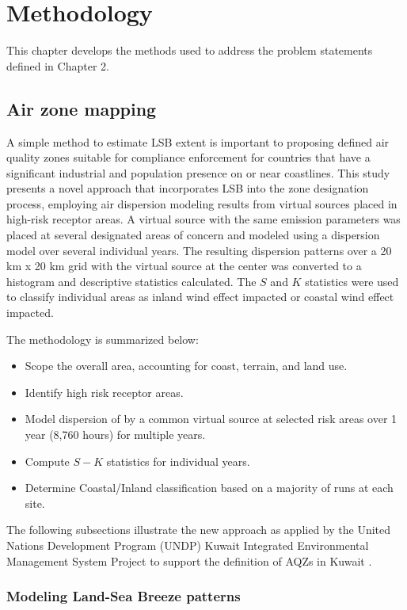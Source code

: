 \chapter{Methodology}
This chapter develops the methods used to address the problem statements defined in Chapter 2.

\section{Air zone mapping}

A simple method to estimate LSB extent is important to proposing defined air quality zones suitable for compliance enforcement for countries that have a significant industrial and population presence on or near coastlines.  This study presents a novel approach that incorporates LSB into the zone designation process, employing air dispersion modeling results from virtual sources placed in high-risk receptor areas.  A virtual source with the same emission parameters was placed at several designated areas of concern and modeled using a dispersion model over several individual years.  The resulting dispersion patterns over a 20 km x 20 km grid with the virtual source at the center was converted to a histogram and descriptive statistics calculated.  The $S$ and $K$ statistics were used to classify individual areas as inland wind effect impacted or coastal wind effect impacted.

The methodology is summarized below:
\begin{itemize}
\item Scope the overall area, accounting for coast, terrain, and land use.
\item Identify high risk receptor areas.
\item Model dispersion of by a common virtual source at selected risk areas over 1 year (8,760 hours) for multiple years.
\item Compute $S-K$ statistics for individual years.
\item Determine Coastal/Inland classification based on a majority of runs at each site.
\end{itemize}

The following subsections illustrate the new approach as applied by the United Nations Development Program (UNDP) Kuwait Integrated Environmental Management System Project to support the definition of AQZs in Kuwait \citep{Freeman2013}.  

\subsection{Modeling Land-Sea Breeze patterns}

